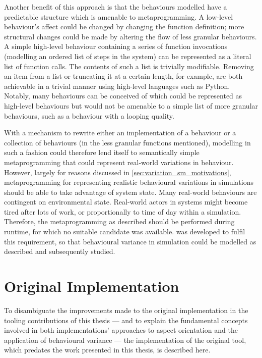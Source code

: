 Another benefit of this approach is that the behaviours modelled have a
predictable structure which is amenable to metaprogramming. A low-level
behaviour's affect could be changed by changing the function definition; more
structural changes could be made by altering the flow of less granular
behaviours. A simple high-level behaviour containing a series of function
invocations (modelling an ordered list of steps in the \sociotechnical system)
can be represented as a literal list of function calls. The contents of such a
list is trivially modifiable. Removing an item from a list or truncating it at a
certain length, for example, are both achievable in a trivial manner using
high-level languages such as Python. Notably, many behaviours can be conceived
of which could be represented as high-level behaviours but would not be amenable
to a simple list of more granular behaviours, such as a behaviour with a looping
quality. 

With a mechanism to rewrite either an implementation of a behaviour or a
collection of behaviours (in the less granular functions mentioned), modelling
in such a fashion could therefore lend itself to semantically simple
metaprogramming that could represent real-world variations in behaviour.
However, largely for reasons discussed in \cref{sec:variation_sm_motivations},
metaprogramming for representing realistic behavioural variations in
\sociotechnical simulations should be able to take advantage of system state.
Many real-world behaviours are contingent on environmental state. Real-world
actors in \sociotechnical systems might become tired after lots of work, or
proportionally to time of day within a simulation. Therefore, the
metaprogramming as described should be performed during runtime, for which no
suitable candidate was available. \pdsf was developed to fulfil this
requirement, so that behavioural variance in \sociotechnical simulation could be
modelled as described and subsequently studied.



\section{Original \pdsf Implementation}\label{sec:prior_work_pdsf}

To disambiguate the improvements made to the original \pdsf implementation
in the tooling contributions of this thesis --- and to explain the fundamental
concepts involved in both implementations' approaches to aspect orientation and
the application of behavioural variance --- the implementation of the original
\pdsf tool, which predates the work presented in this thesis, is described here.



